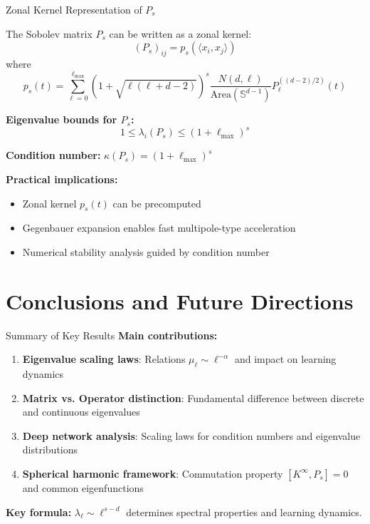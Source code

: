 \documentclass{beamer}
\begin{document}
\begin{frame}{Zonal Kernel Representation of $P_s$}
\begin{theorem}
The Sobolev matrix $P_s$ can be written as a zonal kernel:
\[ (P_s)_{ij} = p_s(\langle x_i, x_j \rangle) \]
where
\[ p_s(t) = \sum_{\ell=0}^{\ell_{\max}} (1 + \sqrt{\ell(\ell + d - 2)})^s \frac{N(d,\ell)}{\text{Area}(\mathbb{S}^{d-1})} P_\ell^{((d-2)/2)}(t) \]
\end{theorem}

\textbf{Eigenvalue bounds for $P_s$:}
\[ 1 \leq \lambda_i(P_s) \leq (1 + \ell_{\max})^s \]

\textbf{Condition number:} $\kappa(P_s) = (1 + \ell_{\max})^s$

\textbf{Practical implications:}
\begin{itemize}
\item Zonal kernel $p_s(t)$ can be precomputed
\item Gegenbauer expansion enables fast multipole-type acceleration
\item Numerical stability analysis guided by condition number
\end{itemize}
\end{frame}

\section{Conclusions and Future Directions}

\begin{frame}{Summary of Key Results}
\textbf{Main contributions:}

\begin{enumerate}
\item \textbf{Eigenvalue scaling laws}: Relations $\mu_\ell \sim \ell^{-\alpha}$ and impact on learning dynamics

\item \textbf{Matrix vs. Operator distinction}: Fundamental difference between discrete and continuous eigenvalues


\item \textbf{Deep network analysis}: Scaling laws for condition numbers and eigenvalue distributions

\item \textbf{Spherical harmonic framework}: Commutation property $[K^{\infty}, P_s] = 0$ and common eigenfunctions
\end{enumerate}

\textbf{Key formula:} $\lambda_\ell \sim \ell^{s-d}$ determines spectral properties and learning dynamics.
\end{frame}
\end{document}
